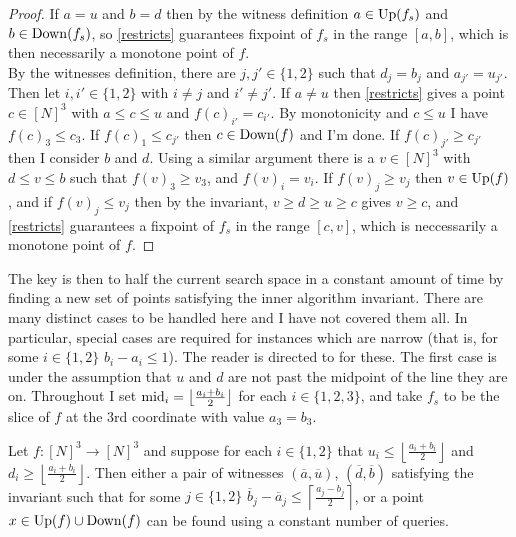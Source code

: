 \begin{proof}
   If $a = u$ and $b = d$ then by the witness definition $a \in \mathrm{Up}(f_s)$ and
  $b \in \mathrm{Down}(f_s)$, so \cref{restricts} guarantees fixpoint of $f_s$ in the range $[a, b]$, which is then
  necessarily a monotone point of $f$. \\
  By the witnesses definition, there are $j, j' \in \{1, 2\}$ such that $d_j = b_j$ and $a_{j'} = u_{j'}$.
  Then let $i, i' \in \{1, 2\}$ with $i \neq j$ and $i' \neq j'$.
  If $a \neq u$ then \cref{restricts} gives a point $c \in [N]^3$ with $a \leq c \leq u$ and $f(c)_{i'} = c_{i'}$.
  By monotonicity and $c \leq u$ I have $f(c)_3 \leq c_3$. If $f(c)_1 \leq c_{j'}$ then $c \in \mathrm{Down}(f)$ and I'm done.
  If $f(c)_{j'} \geq c_{j'}$ then I consider $b$ and $d$. Using a similar argument there is a $v \in [N]^3$ with $d \leq v \leq b$
  such that $f(v)_3 \geq v_3$, and $f(v)_i = v_i$. If $f(v)_j \geq v_j$ then $v \in \mathrm{Up}(f)$, and if $f(v)_j \leq v_j$
  then by the invariant, $v \geq d \geq u \geq c$ gives $v \geq c$, 
  and \cref{restricts} guarantees a fixpoint of $f_s$ in the range $[c, v]$, which is neccessarily a monotone
  point of $f$.
\end{proof}
The key is then to half the current search space in a constant amount of time by finding
a new set of points satisfying the inner algorithm invariant. There are many distinct cases
to be handled here and I have not covered them all. In particular, special cases are required for
instances which are narrow (that is, for some $i \in \{1, 2 \}$ $b_i - a_i \leq 1$). The 
reader is directed to \citep{fasterTarski} for these. The first case is under the assumption that $u$ and $d$ are
not past the midpoint of the line they are on.
Throughout I set $\mathrm{mid}_i = \left \lfloor \frac{a_i + b_i}{2} \right\rfloor$ for each $i \in \{1, 2, 3\}$, and take
$f_s$ to be the slice of $f$ at the $3$rd coordinate with value $a_3 = b_3$.
\begin{lemma}\label{innerMainCase}
  Let $f : [N]^3 \to [N]^3$ and
  suppose for each $i \in \{1, 2\}$ that $u_i \leq \left \lfloor \frac{a_i + b_i}{2} \right \rfloor$
  and $d_i \geq \left \lfloor \frac{a_i + b_i}{2} \right\rfloor$.
  Then either a pair of witnesses $(\overline{a}, \overline{u})$, $(\overline{d}, \overline{b})$ satisfying the invariant
  such that for some $j \in \{1, 2\}$ $\overline{b}_j - \overline{a}_j \leq \left\lceil \frac{a_j - b_j}{2}\right \rceil$, 
  or a point $x \in \mathrm{Up}(f) \cup \mathrm{Down}(f)$
  can be found using a constant
  number of queries. 
\end{lemma}
